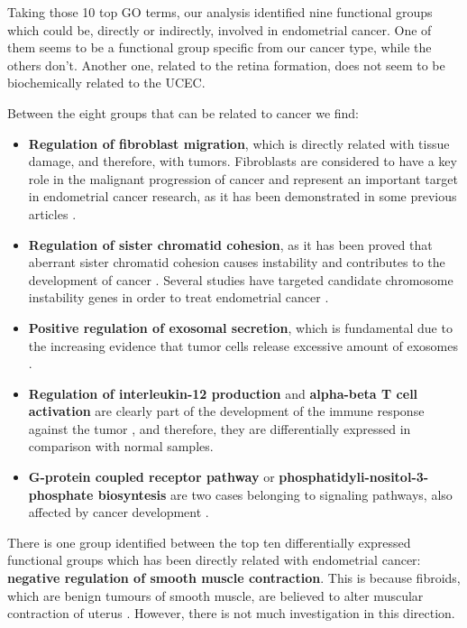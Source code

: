 \documentclass[9pt,twocolumn,twoside]{gsajnl}
\begin{document}
Taking those 10 top GO terms, our analysis identified nine functional groups which could be, directly or indirectly, involved in endometrial cancer. One of them seems to be a functional group specific from our cancer type, while the others don't. Another one, related to the retina formation, does not seem to be biochemically related to the UCEC. 

Between the eight groups that can be related to cancer we find:
\begin{itemize}
  \item \textbf{Regulation of fibroblast migration}, which is directly related with tissue damage, and therefore, with tumors. Fibroblasts are considered to have a key role in the malignant progression of cancer and represent an important target in endometrial cancer research, as it has been demonstrated in some previous articles \citep{Subramaniam2013, Teng2016, Turner2010}.
  \item \textbf{Regulation of sister chromatid cohesion}, as it has been proved that aberrant sister chromatid cohesion causes instability and contributes to the development of cancer \citep{LeGallo2012}. Several studies have targeted candidate chromosome instability genes in order to treat endometrial cancer \citep{Price2013}.
  \item \textbf{Positive regulation of exosomal secretion}, which is fundamental due to the increasing evidence that tumor cells release excessive amount of exosomes \citep{Zhang2015}.
  \item \textbf{Regulation of interleukin-12 production} and \textbf{alpha-beta T cell activation} are clearly part of the development of the immune response against the tumor \citep{Colombo2002, Martin-Orozco2009}, and therefore, they are differentially expressed in comparison with normal samples. 
  \item \textbf{G-protein coupled receptor pathway} or \textbf{phosphatidyli-nositol-3-phosphate biosyntesis} are two cases belonging to signaling pathways, also affected by cancer development \citep{Li2005, Wang2006}.
\end{itemize}

There is one group identified between the top ten differentially expressed functional groups which has been directly related with endometrial cancer: \textbf{negative regulation of smooth muscle contraction}. This is because fibroids, which are benign tumours of smooth muscle, are believed to alter muscular contraction of uterus \citep{GeorgetownUniversityHospital}. However, there is not much investigation in this direction.
\end{document}
